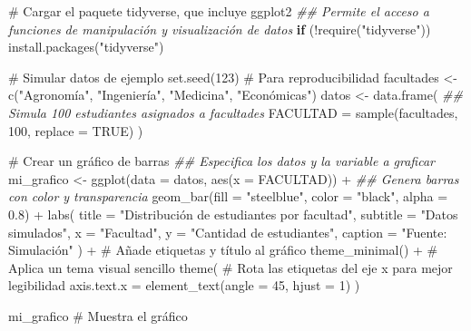 \documentclass[
  spanish,
  a4paper,
  DIV=11,
  numbers=noendperiod,
  onepage,
  openany]{scrreprt}
\newenvironment{Shaded}{\begin{snugshade}}{\end{snugshade}}
\newcommand{\AttributeTok}[1]{\textcolor[rgb]{0.40,0.45,0.13}{#1}}
\newcommand{\CommentTok}[1]{\textcolor[rgb]{0.37,0.37,0.37}{#1}}
\newcommand{\ConstantTok}[1]{\textcolor[rgb]{0.56,0.35,0.01}{#1}}
\newcommand{\ControlFlowTok}[1]{\textcolor[rgb]{0.00,0.23,0.31}{\textbf{#1}}}
\newcommand{\DecValTok}[1]{\textcolor[rgb]{0.68,0.00,0.00}{#1}}
\newcommand{\DocumentationTok}[1]{\textcolor[rgb]{0.37,0.37,0.37}{\textit{#1}}}
\newcommand{\FloatTok}[1]{\textcolor[rgb]{0.68,0.00,0.00}{#1}}
\newcommand{\FunctionTok}[1]{\textcolor[rgb]{0.28,0.35,0.67}{#1}}
\newcommand{\NormalTok}[1]{\textcolor[rgb]{0.00,0.23,0.31}{#1}}
\newcommand{\OtherTok}[1]{\textcolor[rgb]{0.00,0.23,0.31}{#1}}
\newcommand{\SpecialCharTok}[1]{\textcolor[rgb]{0.37,0.37,0.37}{#1}}
\newcommand{\StringTok}[1]{\textcolor[rgb]{0.13,0.47,0.30}{#1}}
\begin{document}
\begin{Shaded}
\begin{Highlighting}[]
\CommentTok{\# Cargar el paquete tidyverse, que incluye ggplot2}
\DocumentationTok{\#\# Permite el acceso a funciones de manipulación y visualización de datos}
\ControlFlowTok{if}\NormalTok{ (}\SpecialCharTok{!}\FunctionTok{require}\NormalTok{(}\StringTok{"tidyverse"}\NormalTok{)) }\FunctionTok{install.packages}\NormalTok{(}\StringTok{"tidyverse"}\NormalTok{) }

\CommentTok{\# Simular datos de ejemplo}
\FunctionTok{set.seed}\NormalTok{(}\DecValTok{123}\NormalTok{) }\CommentTok{\# Para reproducibilidad}
\NormalTok{facultades }\OtherTok{\textless{}{-}} \FunctionTok{c}\NormalTok{(}\StringTok{"Agronomía"}\NormalTok{, }\StringTok{"Ingeniería"}\NormalTok{, }\StringTok{"Medicina"}\NormalTok{, }\StringTok{"Económicas"}\NormalTok{)}
\NormalTok{datos }\OtherTok{\textless{}{-}} \FunctionTok{data.frame}\NormalTok{(}
  \DocumentationTok{\#\# Simula 100 estudiantes asignados a facultades}
  \AttributeTok{FACULTAD =} \FunctionTok{sample}\NormalTok{(facultades, }\DecValTok{100}\NormalTok{, }\AttributeTok{replace =} \ConstantTok{TRUE}\NormalTok{) }
\NormalTok{)}

\CommentTok{\# Crear un gráfico de barras}
\DocumentationTok{\#\# Especifica los datos y la variable a graficar}
\NormalTok{mi\_grafico }\OtherTok{\textless{}{-}} \FunctionTok{ggplot}\NormalTok{(}\AttributeTok{data =}\NormalTok{ datos, }\FunctionTok{aes}\NormalTok{(}\AttributeTok{x =}\NormalTok{ FACULTAD)) }\SpecialCharTok{+} 
  \DocumentationTok{\#\# Genera barras con color y transparencia}
  \FunctionTok{geom\_bar}\NormalTok{(}\AttributeTok{fill =} \StringTok{"steelblue"}\NormalTok{, }\AttributeTok{color =} \StringTok{"black"}\NormalTok{, }\AttributeTok{alpha =} \FloatTok{0.8}\NormalTok{) }\SpecialCharTok{+} 
  \FunctionTok{labs}\NormalTok{(}
    \AttributeTok{title =} \StringTok{"Distribución de estudiantes por facultad"}\NormalTok{,}
    \AttributeTok{subtitle =} \StringTok{"Datos simulados"}\NormalTok{,}
    \AttributeTok{x =} \StringTok{"Facultad"}\NormalTok{,}
    \AttributeTok{y =} \StringTok{"Cantidad de estudiantes"}\NormalTok{,}
    \AttributeTok{caption =} \StringTok{"Fuente: Simulación"}
\NormalTok{  ) }\SpecialCharTok{+} \CommentTok{\# Añade etiquetas y título al gráfico}
  \FunctionTok{theme\_minimal}\NormalTok{() }\SpecialCharTok{+} \CommentTok{\# Aplica un tema visual sencillo}
  \FunctionTok{theme}\NormalTok{(}
    \CommentTok{\# Rota las etiquetas del eje x para mejor legibilidad}
    \AttributeTok{axis.text.x =} \FunctionTok{element\_text}\NormalTok{(}\AttributeTok{angle =} \DecValTok{45}\NormalTok{, }\AttributeTok{hjust =} \DecValTok{1}\NormalTok{) }
\NormalTok{  )}

\NormalTok{mi\_grafico }\CommentTok{\# Muestra el gráfico}
\end{Highlighting}
\end{Shaded}
\end{document}

